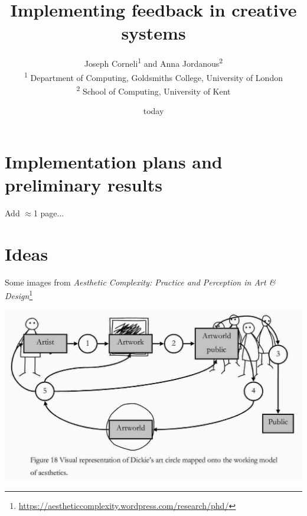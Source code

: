 \documentclass[letter]{article}
\begin{document}
\title{Implementing feedback in creative systems}

\author{Joseph Corneli\textsuperscript{1} and Anna Jordanous\textsuperscript{2}\\
\textsuperscript{1} Department of Computing, Goldsmiths College, University of London\\
\textsuperscript{2} School of Computing, University of Kent}

\date{today}

\maketitle

\begin{abstract} 
\end{abstract}



\section{Implementation plans and preliminary results}\label{sec:implementation}

Add $\approx$1 page...

\section{Ideas}

Some images from \emph{Aesthetic Complexity: Practice and Perception in Art \& Design}\footnote{\url{https://aestheticcomplexity.wordpress.com/research/phd/}}

\includegraphics[width=\columnwidth]{./figures/artworld.jpg}
\end{document}
